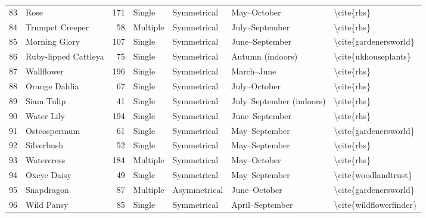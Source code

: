 \begin{table}
\begin{tabular}{rlrllll}
    83 &                      Rose &          171 &      Single &  Symmetrical &              May–October &              \textbackslash cite\{rhs\} \\
    84 &           Trumpet Creeper &           58 &    Multiple &  Symmetrical &           July–September &              \textbackslash cite\{rhs\} \\
    85 &             Morning Glory &          107 &      Single &  Symmetrical &           June–September &   \textbackslash cite\{gardenersworld\} \\
    86 &      Ruby-lipped Cattleya &           75 &      Single &  Symmetrical &         Autumn (indoors) &    \textbackslash cite\{ukhouseplants\} \\
    87 &                Wallflower &          196 &      Single &  Symmetrical &               March–June &              \textbackslash cite\{rhs\} \\
    88 &             Orange Dahlia &           67 &      Single &  Symmetrical &             July–October &              \textbackslash cite\{rhs\} \\
    89 &                Siam Tulip &           41 &      Single &  Symmetrical & July–September (indoors) &              \textbackslash cite\{rhs\} \\
    90 &                Water Lily &          194 &      Single &  Symmetrical &           June–September &              \textbackslash cite\{rhs\} \\
    91 &              Osteospermum &           61 &      Single &  Symmetrical &            May–September &   \textbackslash cite\{gardenersworld\} \\
    92 &                Silverbush &           52 &      Single &  Symmetrical &            May–September &              \textbackslash cite\{rhs\} \\
    93 &                Watercress &          184 &    Multiple &  Symmetrical &              May–October &              \textbackslash cite\{rhs\} \\
    94 &               Oxeye Daisy &           49 &      Single &  Symmetrical &            May–September &    \textbackslash cite\{woodlandtrust\} \\
    95 &                Snapdragon &           87 &    Multiple & Asymmetrical &             June–October &   \textbackslash cite\{gardenersworld\} \\
    96 &                Wild Pansy &           85 &      Single &  Symmetrical &          April–September & \textbackslash cite\{wildflowerfinder\} \\

\end{tabular}
\end{table}
